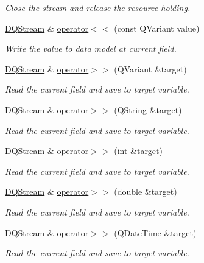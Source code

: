 \begin{DoxyCompactItemize}
\begin{DoxyCompactList}\small\item\em Close the stream and release the resource holding. \item\end{DoxyCompactList}\item 
\hyperlink{classDQStream}{DQStream} \& \hyperlink{classDQStream_ad591d873d4de79097cb8c50e619082f6}{operator$<$$<$} (const QVariant value)
\begin{DoxyCompactList}\small\item\em Write the value to data model at current field. \item\end{DoxyCompactList}\item 
\hyperlink{classDQStream}{DQStream} \& \hyperlink{classDQStream_a43ff7bde07a6a9dd40c0ed76db98b5b7}{operator$>$$>$} (QVariant \&target)
\begin{DoxyCompactList}\small\item\em Read the current field and save to target variable. \item\end{DoxyCompactList}\item 
\hyperlink{classDQStream}{DQStream} \& \hyperlink{classDQStream_a34dd5fbba4cef0dcce46656cbd3c2d5b}{operator$>$$>$} (QString \&target)
\begin{DoxyCompactList}\small\item\em Read the current field and save to target variable. \item\end{DoxyCompactList}\item 
\hyperlink{classDQStream}{DQStream} \& \hyperlink{classDQStream_a62809507138da17e2688f3190b94ad9f}{operator$>$$>$} (int \&target)
\begin{DoxyCompactList}\small\item\em Read the current field and save to target variable. \item\end{DoxyCompactList}\item 
\hyperlink{classDQStream}{DQStream} \& \hyperlink{classDQStream_a48933b649572d912895541df130512fd}{operator$>$$>$} (double \&target)
\begin{DoxyCompactList}\small\item\em Read the current field and save to target variable. \item\end{DoxyCompactList}\item 
\hyperlink{classDQStream}{DQStream} \& \hyperlink{classDQStream_a14e001642cbe6c4950110fc36c4e4c94}{operator$>$$>$} (QDateTime \&target)
\begin{DoxyCompactList}\small\item\em Read the current field and save to target variable. \item\end{DoxyCompactList}\end{DoxyCompactItemize}


